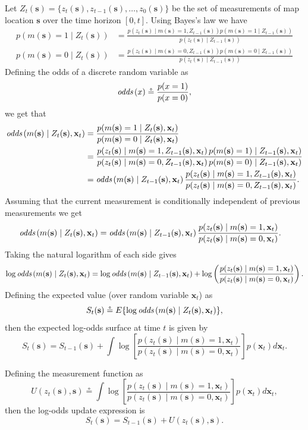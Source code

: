 \documentclass{article}
\newcommand{\defeq}{\circeq}
\newcommand{\odd}[1]{\text{\em odds}\left(#1\right)}
\newcommand{\sbf}{\mathbf{s}}
\newcommand{\xbf}{\mathbf{x}}
\begin{document}
Let $Z_t(\sbf) = \{z_t(\sbf), z_{t-1}(\sbf), \dots, z_0(\sbf)\}$ be the set of measurements of map location $\sbf$ over the time horizon $[0, t]$.  Using Bayes's law we have
\begin{align*}
	p(m(\sbf)=1 \mid Z_t(\sbf)) &= \frac{p(z_t(\sbf)\mid m(\sbf)=1, Z_{t-1}(\sbf)) p(m(\sbf)=1 \mid Z_{t-1}(\sbf))}{p(z_t(\sbf) \mid Z_{t-1}(\sbf))} \\
	p(m(\sbf)=0 \mid Z_t(\sbf)) &= \frac{p(z_t(\sbf)\mid m(\sbf)=0, Z_{t-1}(\sbf)) p(m(\sbf)=0 \mid Z_{t-1}(\sbf))}{p(z_t(\sbf) \mid Z_{t-1}(\sbf))}
\end{align*}
Defining the odds of a discrete random variable as
\[
\odd{x} \defeq \frac{p(x=1)}{p(x=0)},
\]
we get that 
\begin{align*}
	\odd{m(\sbf)\mid Z_t(\sbf), \xbf_t} &= \frac{p(m(\sbf)=1 \mid Z_t(\sbf), \xbf_t)}{p(m(\sbf)=0 \mid Z_t(\sbf), \xbf_t)} \\
	&= \frac{p(z_t(\sbf) \mid m(\sbf)=1, Z_{t-1}(\sbf), \xbf_t) \, p(m(\sbf)=1)\mid Z_{t-1}(\sbf), \xbf_t)}{p(z_t(\sbf)\mid m(\sbf)=0, Z_{t-1}(\sbf), \xbf_t) \, p(m(\sbf)=0)\mid Z_{t-1}(\sbf), \xbf_t)} \\
	&= \odd{m(\sbf) \mid Z_{t-1}(\sbf), \xbf_t}  \frac{p(z_t(\sbf)\mid m(\sbf)=1, Z_{t-1}(\sbf), \xbf_t)}{p(z_t(\sbf)\mid m(\sbf)=0, Z_{t-1}(\sbf), \xbf_t)}.
\end{align*}
Assuming that the current measurement is conditionally independent of previous measurements we get
\begin{align*}
	\odd{m(\sbf)\mid Z_t(\sbf), \xbf_t} 
		&= \odd{m(\sbf) \mid Z_{t-1}(\sbf), \xbf_t}  \frac{p(z_t(\sbf)\mid m(\sbf)=1, \xbf_t)}{p(z_t(\sbf)\mid m(\sbf)=0, \xbf_t)}.
\end{align*}
Taking the natural logarithm of each side gives
\[
\log\odd{m(\sbf)\mid Z_t(\sbf), \xbf_t} = \log \odd{m(\sbf) \mid Z_{t-1}(\sbf), \xbf_t} + \log\left(\frac{p(z_t(\sbf)\mid m(\sbf)=1, \xbf_t)}{p(z_t(\sbf)\mid m(\sbf)=0, \xbf_t)}\right).
\]
Defining the expected value (over random variable $\xbf_t$) as
\[
S_t(\sbf) \defeq E\{\log\odd{m(\sbf)\mid Z_t(\sbf), \xbf_t}\},
\]
then the expected log-odds surface at time $t$ is given by
\[
S_t(\sbf) = S_{t-1}(\sbf) + \int\log\left[ \frac{p(z_t(\sbf)\mid m(\sbf)=1, \xbf_t)}{p(z_t(\sbf)\mid m(\sbf)=0, \xbf_t)}\right]p(\xbf_t)d\xbf_t.
\] 

Defining the measurement function as 
\begin{equation} \label{eq:measurement_function}
U(z_t(\sbf), \sbf) \defeq \int\log\left[ \frac{p(z_t(\sbf)\mid m(\sbf)=1, \xbf_t)}{p(z_t(\sbf)\mid m(\sbf)=0, \xbf_t)}\right]p(\xbf_t)d\xbf_t,	
\end{equation}
then the log-odds update expression is
\begin{equation}\label{eq:log_odds_surface_update}
S_t(\sbf) = S_{t-1}(\sbf) + U(z_t(\sbf), \sbf).
\end{equation}
\end{document}
